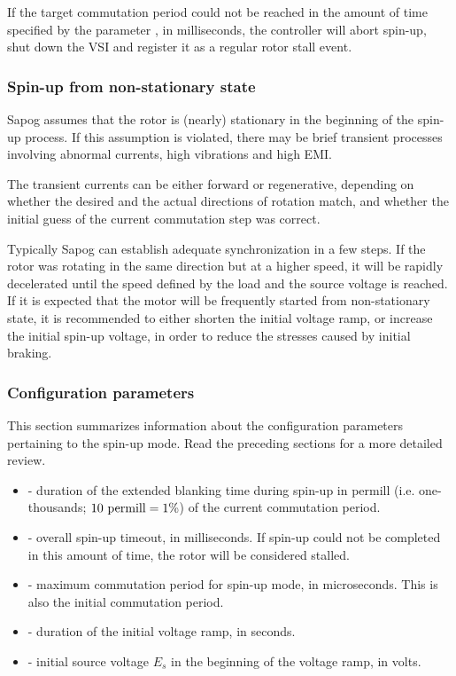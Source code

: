 \documentclass{zubaxdoc}
\begin{document}
If the target commutation period could not be reached in the amount of time specified by
the parameter , in milliseconds, the controller will abort spin-up,
shut down the VSI and register it as a regular rotor stall event.

\subsubsection{Spin-up from non-stationary state}

Sapog assumes that the rotor is (nearly) stationary in the beginning of the spin-up process.
If this assumption is violated, there may be brief transient processes involving abnormal currents,
high vibrations and high EMI.

The transient currents can be either forward or regenerative, depending on whether the desired
and the actual directions of rotation match, and whether the initial guess of the current
commutation step was correct.

Typically Sapog can establish adequate synchronization in a few steps.
If the rotor was rotating in the same direction but at a higher speed,
it will be rapidly decelerated until the speed defined by the load and the source voltage is
reached.
If it is expected that the motor will be frequently started from non-stationary state,
it is recommended to either shorten the initial voltage ramp, or increase the initial
spin-up voltage, in order to reduce the stresses caused by initial braking.

\subsubsection{Configuration parameters}

This section summarizes information about the configuration parameters pertaining to the spin-up mode.
Read the preceding sections for a more detailed review.

\begin{itemize}
\item {} - duration of the extended blanking time during spin-up in permill
(i.e. one-thousands; $10\text{\space{}permill} = 1\% $) of the current commutation period.
\item {} - overall spin-up timeout, in milliseconds.
If spin-up could not be completed in this amount of time, the rotor will be considered stalled.
\item {} - maximum commutation period for spin-up mode, in microseconds.
This is also the initial commutation period.
\item {} - duration of the initial voltage ramp, in seconds.
\item {} - initial source voltage $E_s$ in the beginning of the voltage ramp, in volts.
\end{itemize}
\end{document}
